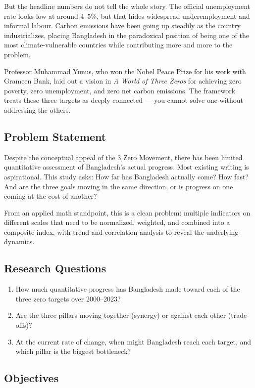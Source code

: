 \documentclass[12pt,a4paper]{article}
\begin{document}
But the headline numbers do not tell the whole story. The official unemployment rate looks low at around 4--5\%, but that hides widespread underemployment and informal labour. Carbon emissions have been going up steadily as the country industrializes, placing Bangladesh in the paradoxical position of being one of the most climate-vulnerable countries while contributing more and more to the problem.

Professor Muhammad Yunus, who won the Nobel Peace Prize for his work with Grameen Bank, laid out a vision in \textit{A World of Three Zeros} \citep{yunus2017three} for achieving zero poverty, zero unemployment, and zero net carbon emissions. The framework treats these three targets as deeply connected --- you cannot solve one without addressing the others.

\subsection{Problem Statement}

Despite the conceptual appeal of the 3 Zero Movement, there has been limited quantitative assessment of Bangladesh's actual progress. Most existing writing is aspirational. This study asks: How far has Bangladesh actually come? How fast? And are the three goals moving in the same direction, or is progress on one coming at the cost of another?

From an applied math standpoint, this is a clean problem: multiple indicators on different scales that need to be normalized, weighted, and combined into a composite index, with trend and correlation analysis to reveal the underlying dynamics.

\subsection{Research Questions}

\begin{enumerate}
  \item How much quantitative progress has Bangladesh made toward each of the three zero targets over 2000--2023?
  \item Are the three pillars moving together (synergy) or against each other (trade-offs)?
  \item At the current rate of change, when might Bangladesh reach each target, and which pillar is the biggest bottleneck?
\end{enumerate}

\subsection{Objectives}
\end{document}
